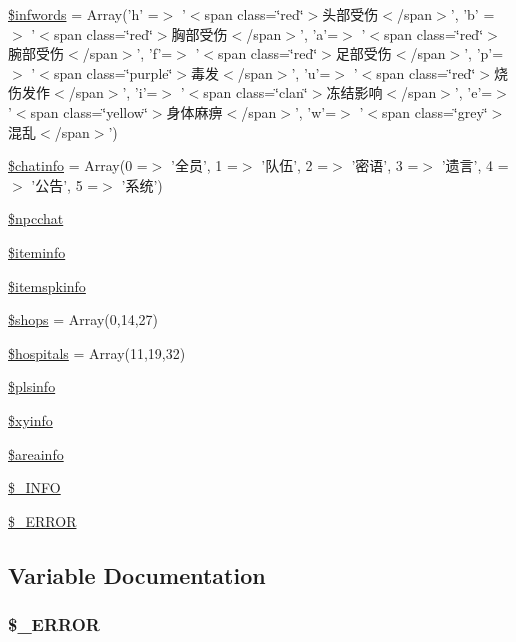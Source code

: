 \begin{DoxyCompactItemize}
\item 
\hyperlink{resources_8php_ac3527ff4180f28da3e03cb071838cc4d}{\$infwords} = Array('h' =$>$ '$<$span class=\char`\"{}red\char`\"{}$>$头部受伤$<$/span$>$', 'b' =$>$ '$<$span class=\char`\"{}red\char`\"{}$>$胸部受伤$<$/span$>$', 'a'=$>$ '$<$span class=\char`\"{}red\char`\"{}$>$腕部受伤$<$/span$>$', 'f'=$>$ '$<$span class=\char`\"{}red\char`\"{}$>$足部受伤$<$/span$>$', 'p'=$>$ '$<$span class=\char`\"{}purple\char`\"{}$>$毒发$<$/span$>$', 'u'=$>$ '$<$span class=\char`\"{}red\char`\"{}$>$烧伤发作$<$/span$>$', 'i'=$>$ '$<$span class=\char`\"{}clan\char`\"{}$>$冻结影响$<$/span$>$', 'e'=$>$ '$<$span class=\char`\"{}yellow\char`\"{}$>$身体麻痹$<$/span$>$', 'w'=$>$ '$<$span class=\char`\"{}grey\char`\"{}$>$混乱$<$/span$>$')
\item 
\hyperlink{resources_8php_abcea2ccdba90758edbd052712f3b2cec}{\$chatinfo} = Array(0 =$>$ '全员', 1 =$>$ '队伍', 2 =$>$ '密语', 3 =$>$ '遗言', 4 =$>$ '公告', 5 =$>$ '系统')
\item 
\hyperlink{resources_8php_a413262abf345c0466e9927a412571365}{\$npcchat}
\item 
\hyperlink{resources_8php_abf61f517048be2c7cc3d9c24e62f1160}{\$iteminfo}
\item 
\hyperlink{resources_8php_af5da654ca4941efa7e59e9608ad80106}{\$itemspkinfo}
\item 
\hyperlink{resources_8php_a6a4f6f4fa7edf238e168beb18f0870af}{\$shops} = Array(0,14,27)
\item 
\hyperlink{resources_8php_a522f774b7af7274c8142c2bf00854709}{\$hospitals} = Array(11,19,32)
\item 
\hyperlink{resources_8php_a80fc03ebf0cae6b56b4e8f4738273199}{\$plsinfo}
\item 
\hyperlink{resources_8php_aabc8b00fb3b56eab2f2d6ff8e1f0839c}{\$xyinfo}
\item 
\hyperlink{resources_8php_aabf13bd9fe14d8a463c5f4b334361291}{\$areainfo}
\item 
\hyperlink{resources_8php_acc171a42cb2c06ea14b041fc55b5cc24}{\$\+\_\+\+I\+N\+F\+O}
\item 
\hyperlink{resources_8php_a07754cf9f14d6271b746015934a7753e}{\$\+\_\+\+E\+R\+R\+O\+R}
\end{DoxyCompactItemize}


\subsection{Variable Documentation}
\hypertarget{resources_8php_a07754cf9f14d6271b746015934a7753e}{
\subsubsection[{\$\+\_\+\+E\+R\+R\+O\+R}]{\setlength{\rightskip}{0pt plus 5cm}\$\+\_\+\+E\+R\+R\+O\+R}}\label{resources_8php_a07754cf9f14d6271b746015934a7753e}


